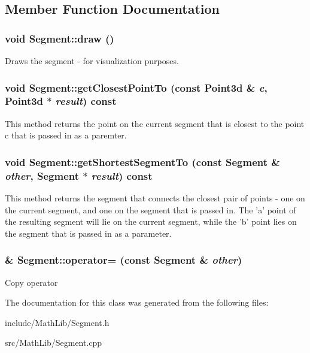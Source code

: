 \subsection{Member Function Documentation}
\hypertarget{classCartWheel_1_1Math_1_1Segment_ace0de722d19d43f11e26cee59d7ca8e7}{
\subsubsection[{draw}]{\setlength{\rightskip}{0pt plus 5cm}void Segment::draw ()}}
\label{classCartWheel_1_1Math_1_1Segment_ace0de722d19d43f11e26cee59d7ca8e7}
Draws the segment -\/ for visualization purposes. \hypertarget{classCartWheel_1_1Math_1_1Segment_a375a32c214713c92f1e1a30593080f46}{
\subsubsection[{getClosestPointTo}]{\setlength{\rightskip}{0pt plus 5cm}void Segment::getClosestPointTo (const {\bf Point3d} \& {\em c}, \/  {\bf Point3d} $\ast$ {\em result}) const}}
\label{classCartWheel_1_1Math_1_1Segment_a375a32c214713c92f1e1a30593080f46}
This method returns the point on the current segment that is closest to the point c that is passed in as a paremter. \hypertarget{classCartWheel_1_1Math_1_1Segment_a50ac8e268170b53058c103507481edd9}{
\subsubsection[{getShortestSegmentTo}]{\setlength{\rightskip}{0pt plus 5cm}void Segment::getShortestSegmentTo (const {\bf Segment} \& {\em other}, \/  {\bf Segment} $\ast$ {\em result}) const}}
\label{classCartWheel_1_1Math_1_1Segment_a50ac8e268170b53058c103507481edd9}
This method returns the segment that connects the closest pair of points -\/ one on the current segment, and one on the segment that is passed in. The 'a' point of the resulting segment will lie on the current segment, while the 'b' point lies on the segment that is passed in as a parameter. \hypertarget{classCartWheel_1_1Math_1_1Segment_ab43787f002b39c30c99310b1528a43d1}{
\subsubsection[{operator=}]{ \& Segment::operator= (const {\bf Segment} \& {\em other})}}
\label{classCartWheel_1_1Math_1_1Segment_ab43787f002b39c30c99310b1528a43d1}
Copy operator 

The documentation for this class was generated from the following files:\begin{DoxyCompactItemize}
\item 
include/MathLib/Segment.h\item 
src/MathLib/Segment.cpp\end{DoxyCompactItemize}
